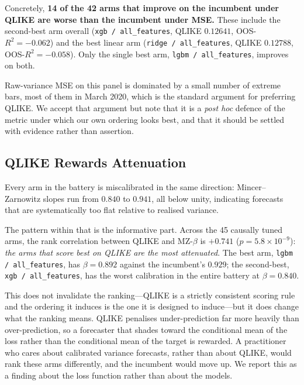 Concretely, \textbf{14 of the 42 arms that improve on the incumbent under QLIKE
are worse than the incumbent under MSE.} These include the second-best arm
overall (\texttt{xgb / all\_features}, QLIKE $0.12641$, OOS-$R^2 = -0.062$) and
the best linear arm (\texttt{ridge / all\_features}, QLIKE $0.12788$,
OOS-$R^2 = -0.058$). Only the single best arm, \texttt{lgbm / all\_features},
improves on both.

Raw-variance MSE on this panel is dominated by a small number of extreme bars,
most of them in March 2020, which is the standard argument for preferring
QLIKE. We accept that argument but note that it is a \emph{post hoc} defence of
the metric under which our own ordering looks best, and that it should be
settled with evidence rather than assertion.

\subsection{QLIKE Rewards Attenuation}
\label{sec:calibration}

Every arm in the battery is miscalibrated in the same direction: Mincer--Zarnowitz
slopes run from $0.840$ to $0.941$, all below unity, indicating forecasts that
are systematically too flat relative to realised variance.

The pattern within that is the informative part. Across the 45 causally tuned
arms, the rank correlation between QLIKE and MZ-$\beta$ is $\mathbf{+0.741}$
($p = 5.8 \times 10^{-9}$):
\emph{the arms that score best on QLIKE are the most attenuated}. The best arm,
\texttt{lgbm / all\_features}, has $\beta = 0.892$ against the incumbent's
$0.929$; the second-best, \texttt{xgb / all\_features}, has the worst
calibration in the entire battery at $\beta = 0.840$.

This does not invalidate the ranking---QLIKE is a strictly consistent scoring
rule and the ordering it induces is the one it is designed to induce---but it
does change what the ranking means. QLIKE penalises under-prediction far more
heavily than over-prediction, so a forecaster that shades toward the
conditional mean of the loss rather than the conditional mean of the target is
rewarded. A practitioner who cares about calibrated variance forecasts, rather
than about QLIKE, would rank these arms differently, and the incumbent would
move up. We report this as a finding about the loss function rather than about
the models.

